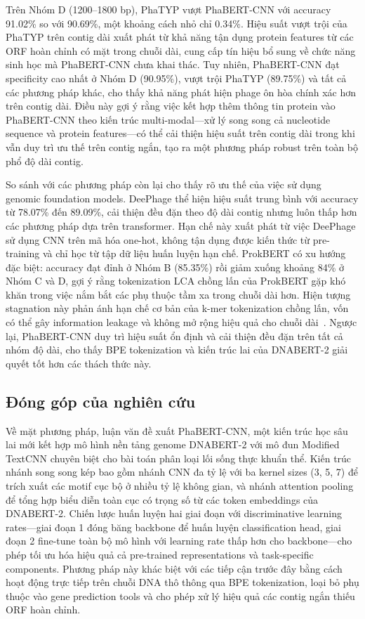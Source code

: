 Trên Nhóm D (1200--1800 bp), PhaTYP vượt PhaBERT-CNN với accuracy 91.02\% so với 90.69\%, một khoảng cách nhỏ chỉ 0.34\%. Hiệu suất vượt trội của PhaTYP trên contig dài xuất phát từ khả năng tận dụng protein features từ các ORF hoàn chỉnh có mặt trong chuỗi dài, cung cấp tín hiệu bổ sung về chức năng sinh học mà PhaBERT-CNN chưa khai thác. Tuy nhiên, PhaBERT-CNN đạt specificity cao nhất ở Nhóm D (90.95\%), vượt trội PhaTYP (89.75\%) và tất cả các phương pháp khác, cho thấy khả năng phát hiện phage ôn hòa chính xác hơn trên contig dài. Điều này gợi ý rằng việc kết hợp thêm thông tin protein vào PhaBERT-CNN theo kiến trúc multi-modal—xử lý song song cả nucleotide sequence và protein features—có thể cải thiện hiệu suất trên contig dài trong khi vẫn duy trì ưu thế trên contig ngắn, tạo ra một phương pháp robust trên toàn bộ phổ độ dài contig.

So sánh với các phương pháp còn lại cho thấy rõ ưu thế của việc sử dụng genomic foundation models. DeePhage thể hiện hiệu suất trung bình với accuracy từ 78.07\% đến 89.09\%, cải thiện đều đặn theo độ dài contig nhưng luôn thấp hơn các phương pháp dựa trên transformer. Hạn chế này xuất phát từ việc DeePhage sử dụng CNN trên mã hóa one-hot, không tận dụng được kiến thức từ pre-training và chỉ học từ tập dữ liệu huấn luyện hạn chế. ProkBERT có xu hướng đặc biệt: accuracy đạt đỉnh ở Nhóm B (85.35\%) rồi giảm xuống khoảng 84\% ở Nhóm C và D, gợi ý rằng tokenization LCA chồng lấn của ProkBERT gặp khó khăn trong việc nắm bắt các phụ thuộc tầm xa trong chuỗi dài hơn. Hiện tượng stagnation này phản ánh hạn chế cơ bản của k-mer tokenization chồng lấn, vốn có thể gây information leakage và không mở rộng hiệu quả cho chuỗi dài~\cite{zhou2023dnabert}. Ngược lại, PhaBERT-CNN duy trì hiệu suất ổn định và cải thiện đều đặn trên tất cả nhóm độ dài, cho thấy BPE tokenization và kiến trúc lai của DNABERT-2 giải quyết tốt hơn các thách thức này.

\subsection{Đóng góp của nghiên cứu}
\label{sec:contributions}

Về mặt phương pháp, luận văn đề xuất PhaBERT-CNN, một kiến trúc học sâu lai mới kết hợp mô hình nền tảng genome DNABERT-2 với mô đun Modified TextCNN chuyên biệt cho bài toán phân loại lối sống thực khuẩn thể. Kiến trúc nhánh song song kép bao gồm nhánh CNN đa tỷ lệ với ba kernel sizes (3, 5, 7) để trích xuất các motif cục bộ ở nhiều tỷ lệ không gian, và nhánh attention pooling để tổng hợp biểu diễn toàn cục có trọng số từ các token embeddings của DNABERT-2. Chiến lược huấn luyện hai giai đoạn với discriminative learning rates—giai đoạn 1 đóng băng backbone để huấn luyện classification head, giai đoạn 2 fine-tune toàn bộ mô hình với learning rate thấp hơn cho backbone—cho phép tối ưu hóa hiệu quả cả pre-trained representations và task-specific components. Phương pháp này khác biệt với các tiếp cận trước đây bằng cách hoạt động trực tiếp trên chuỗi DNA thô thông qua BPE tokenization, loại bỏ phụ thuộc vào gene prediction tools và cho phép xử lý hiệu quả các contig ngắn thiếu ORF hoàn chỉnh.

